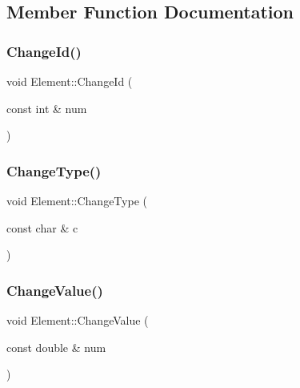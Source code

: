 \subsection{Member Function Documentation}
\mbox{\label{class_element_ae485f257d8d1bfa17799e89a5c755050}} 
\subsubsection{\texorpdfstring{Change\+Id()}{ChangeId()}}
{\footnotesize\ttfamily void Element\+::\+Change\+Id (\begin{DoxyParamCaption}\item[{const int \&}]{num }\end{DoxyParamCaption})}

\mbox{\label{class_element_ad815916d8823e895a58aae13d6f9bdc1}} 
\subsubsection{\texorpdfstring{Change\+Type()}{ChangeType()}}
{\footnotesize\ttfamily void Element\+::\+Change\+Type (\begin{DoxyParamCaption}\item[{const char \&}]{c }\end{DoxyParamCaption})}

\mbox{\label{class_element_a05e7b2e6cd8036ea3ae07cb71df60499}} 
\subsubsection{\texorpdfstring{Change\+Value()}{ChangeValue()}}
{\footnotesize\ttfamily void Element\+::\+Change\+Value (\begin{DoxyParamCaption}\item[{const double \&}]{num }\end{DoxyParamCaption})}

\mbox{\label{class_element_a5610b61ae29c76de5806068d30366e3c}} 
